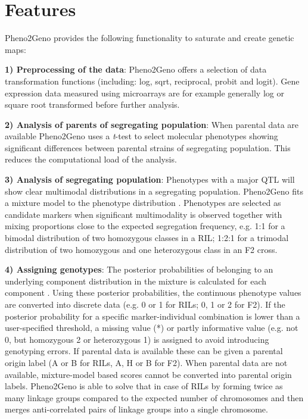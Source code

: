 \section{Features}
Pheno2Geno provides the following functionality to saturate and create genetic maps:

{\bf 1) Preprocessing of the data}: Pheno2Geno offers a selection of 
data transformation functions (including: log, sqrt, reciprocal, probit and logit). 
Gene expression data measured using microarrays are for example generally log 
\cite{Quackenbush:2002} or square root\cite{Jansen:2001a, Gort:2010} transformed before 
further analysis.

{\bf 2) Analysis of parents of segregating population}: When parental data are available 
Pheno2Geno uses a \emph{t}-test to select molecular phenotypes showing significant 
differences between parental strains of segregating population. This reduces the computational load 
of the analysis.

{\bf 3) Analysis of segregating population}:
Phenotypes with a major QTL will show clear multimodal distributions in a segregating 
population. Pheno2Geno fits a mixture model to the phenotype distribution \cite{Jansen:1993, 
Jansen:2001a, Benaglia:2009}. Phenotypes are selected as candidate markers when 
significant multimodality is observed together with mixing proportions close to the expected segregation 
frequency, e.g. 1:1 for a bimodal distribution of two homozygous classes in 
a RIL; 1:2:1 for a trimodal distribution of two homozygous and one heterozygous class in 
an F2 cross.

{\bf 4) Assigning genotypes}:
The posterior probabilities of belonging to an underlying component distribution in the 
mixture is calculated for each component \cite{Jansen:2001b, Benaglia:2009}. Using these 
posterior probabilities, the continuous phenotype values are converted into discrete data 
(e.g. 0 or 1 for RILs; 0, 1 or 2 for F2).  If the posterior probability for a specific 
marker-individual combination is lower than a user-specified threshold, a missing value 
(*) or partly informative value (e.g. not 0, but homozygous 2 or heterozygous 1) is 
assigned to avoid introducing genotyping errors. If parental data is available these can 
be given a parental origin label (A or B for RILs, A, H or B for F2). 
When parental data are not available, mixture-model based scores cannot be converted into 
parental origin labels. Pheno2Geno is able to solve that in case of RILs by forming twice 
as many linkage groups compared to the expected number of chromosomes and then merges 
anti-correlated pairs of linkage groups into a single chromosome.

